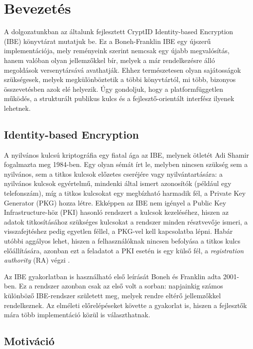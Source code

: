 \chapter{Bevezetés}

A dolgozatunkban az általunk fejlesztett CryptID Identity-based Encryption (IBE) könyvtárat mutatjuk be. Ez a Boneh-Franklin IBE egy újszerű implementációja, mely reményeink szerint nemcsak egy újabb megvalósítás, hanem valóban olyan jellemzőkkel bír, melyek a már rendelkezésre álló megoldások versenytársává avathatják. Ehhez természetesen olyan sajátosságok szükségesek, melyek megkülönböztetik a többi könyvtártól, mi több, bizonyos összevetésben azok elé helyezik. Úgy gondoljuk, hogy a platformfüggetlen működés, a strukturált publikus kulcs és a fejlesztő-orientált interfész ilyenek lehetnek.

\section{Identity-based Encryption}

A nyilvános kulcsú kriptográfia egy fiatal ága az IBE, melynek ötletét Adi Shamir fogalmazta meg 1984-ben. Egy olyan sémát írt le, melyben nincsen szükség sem a nyilvános, sem a titkos kulcsok előzetes cseréjére vagy nyilvántartására: a nyilvános kulcsok egyértelmű, mindenki által ismert azonosítók (például egy telefonszám), míg a titkos kulcsokat egy megbízható harmadik fél, a Private Key Generator (PKG) hozza létre. Ekképpen az IBE nem igényel a Public Key Infrastructure-höz (PKI) hasonló rendszert a kulcsok kezeléséhez, hiszen az adatok titkosításához szükséges kulcsokat a rendszer minden résztvevője ismeri, a visszafejtéshez pedig egyetlen féllel, a PKG-vel kell kapcsolatba lépni. Habár utóbbi aggályos lehet, hiszen a felhasználóknak nincsen befolyása a titkos kulcs előállítására, azonban ezt a feladatot a PKI esetén is egy külső fél, a \textit{registration authority} (RA) végzi \cite{Buchmann::IntroductionToPublicKeyInfrastructures}. 

Az IBE gyakorlatban is használható első leírását Boneh és Franklin adta 2001-ben. Ez a rendszer azonban csak az első volt a sorban: napjainkig számos különböző IBE-rendszer született meg, melyek rendre eltérő jellemzőkkel rendelkeznek. Az elméleti előrelépéseket követte a gyakorlat is, hiszen a fejlesztők mára több implementáció közül is választhatnak.

\section{Motiváció}

